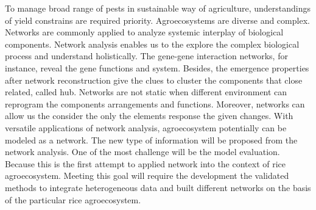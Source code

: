 To manage broad range of pests in sustainable way of agriculture, understandings of yield constrains are required priority. Agroecosystems are diverse and complex. Networks are commonly applied to analyze systemic interplay of biological components. Network analysis enables us to the explore the complex biological process and understand holistically. The gene-gene interaction networks, for instance, reveal the gene functions and system. Besides, the emergence properties after network reconstruction give the clues to cluster the components that close related, called hub. Networks are not static when different environment can reprogram the components arrangements and functions. Moreover, networks can allow us the consider the only the elements response the given changes. With versatile applications of network analysis, agroecosystem potentially can be modeled as a network. The new type of information will be proposed from the network analysis. One of the most challenge will be the model evaluation. Because this is the first attempt to applied network into the context of rice agroecosystem. Meeting this goal will require the development the validated methods to integrate heterogeneous data and built different networks on the basis of the particular rice agroecosystem.   


